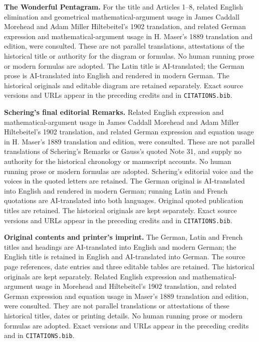 \par\endgroup\clearpage
\thispagestyle{empty}\begingroup\fontsize{9}{9.5}\selectfont\raggedright
{}\medskip
\textbf{The Wonderful Pentagram.} For the title and Articles 1--8, related English elimination and geometrical mathematical-argument usage in James Caddall Morehead and Adam Miller Hiltebeitel’s 1902 translation, and related German expression and mathematical-argument usage in H. Maser’s 1889 translation and edition, were consulted. These are not parallel translations, attestations of the historical title or authority for the diagram or formulas. No human running prose or modern formulas are adopted. The Latin title is AI-translated; the German prose is AI-translated into English and rendered in modern German. The historical originals and editable diagram are retained separately. Exact source versions and URLs appear in the preceding credits and in \texttt{CITATIONS.bib}.
\par\endgroup\clearpage
\thispagestyle{empty}\begingroup\fontsize{9}{9.5}\selectfont\raggedright
{}\medskip
\textbf{Schering’s final editorial Remarks.} Related English expression and mathematical-argument usage in James Caddall Morehead and Adam Miller Hiltebeitel’s 1902 translation, and related German expression and equation usage in H. Maser’s 1889 translation and edition, were consulted. These are not parallel translations of Schering’s Remarks or Gauss’s quoted Note 31, and supply no authority for the historical chronology or manuscript accounts. No human running prose or modern formulas are adopted. Schering’s editorial voice and the voices in the quoted letters are retained. The German original is AI-translated into English and rendered in modern German; running Latin and French quotations are AI-translated into both languages. Original quoted publication titles are retained. The historical originals are kept separately. Exact source versions and URLs appear in the preceding credits and in \texttt{CITATIONS.bib}.
\par\endgroup\clearpage
\thispagestyle{empty}\begingroup\fontsize{9}{9.5}\selectfont\raggedright
{}\medskip
\textbf{Original contents and printer’s imprint.} The German, Latin and French titles and headings are AI-translated into English and modern German; the English title is retained in English and AI-translated into German. The source page references, date entries and three editable tables are retained. The historical originals are kept separately. Related English expression and mathematical-argument usage in Morehead and Hiltebeitel’s 1902 translation, and related German expression and equation usage in Maser’s 1889 translation and edition, were consulted. They are not parallel translations or attestations of these historical titles, dates or printing details. No human running prose or modern formulas are adopted. Exact versions and URLs appear in the preceding credits and in \texttt{CITATIONS.bib}.
